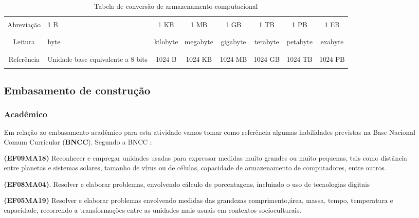 \begin{table}[H] \label{storagetable}
	\centering
	\begin{tabular}{|c|p{16mm}|c|c|c|c|c|c|}
		\hline
		&&&&&&&\\
		Abreviação &  1 B & 1 KB & 1 MB & 1 GB & 1 TB & 1 PB & 1 EB \\
		&&&&&&&\\
		\hline
		&&&&&&&\\
		Leitura & byte & kilobyte & megabyte & gigabyte & terabyte & petabyte & exabyte \\
		&&&&&&&\\
		\hline
		&&&&&&&\\
		Referência & Unidade base equivalente a 8 bits & 1024 B & 1024 KB & 1024 MB & 1024 GB & 1024 TB & 1024 PB \\
		&&&&&&&\\
		\hline
	\end{tabular}
	\caption{Tabela de conversão de armazenamento computacional}
\end{table}


\subsection{Embasamento de construção}
\subsubsection{Acadêmico}

Em relação ao embasamento acadêmico para esta atividade vamos tomar como referência algumas habilidades previstas na Base Nacional Comum Curricular (\textbf{BNCC}). 
Segundo a BNCC :
	\begin{citacao}
	\textbf{(EF09MA18)} Reconhecer e empregar unidades usadas para expressar medidas muito grandes ou muito pequenas, tais como distância entre planetas e sistemas solares, tamanho de vírus ou de células, capacidade de armazenamento de computadores, entre outros.
	
	\textbf{(EF08MA04)}. Resolver e elaborar problemas, envolvendo cálculo de porcentagens, incluindo o uso de tecnologias digitais

	\textbf{(EF05MA19)} Resolver e elaborar problemas envolvendo medidas das grandezas comprimento,área, massa, tempo, temperatura e capacidade, recorrendo a transformações entre as unidades mais usuais em contextos socioculturais.

	\end{citacao} 

